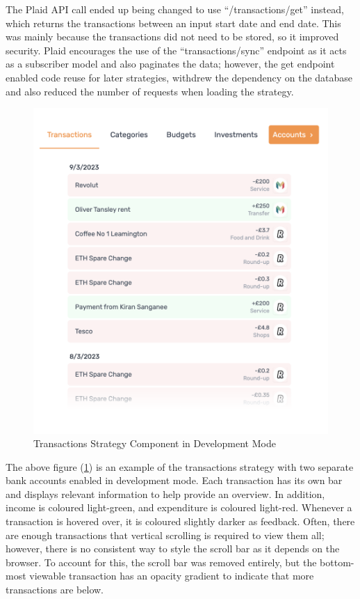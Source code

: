 The Plaid API call ended up being changed to use ``/transactions/get'' instead, which returns the transactions between an input start date and end date. This was mainly because the transactions did not need to be stored, so it improved security. Plaid encourages the use of the ``transactions/sync'' endpoint as it acts as a subscriber model and also paginates the data; however, the get endpoint enabled code reuse for later strategies, withdrew the dependency on the database and also reduced the number of requests when loading the strategy.

\begin{figure}[H]
	\centering
	\includegraphics[width=\textwidth]{images/transactions_development.png}
	\caption{Transactions Strategy Component in Development Mode}
	\label{fig:TransactionsStrategy}
\end{figure}

The above figure (\ref{fig:TransactionsStrategy}) is an example of the transactions strategy with two separate bank accounts enabled in development mode. Each transaction has its own bar and displays relevant information to help provide an overview. In addition, income is coloured light-green, and expenditure is coloured light-red. Whenever a transaction is hovered over, it is coloured slightly darker as feedback. Often, there are enough transactions that vertical scrolling is required to view them all; however, there is no consistent way to style the scroll bar as it depends on the browser. To account for this, the scroll bar was removed entirely, but the bottom-most viewable transaction has an opacity gradient to indicate that more transactions are below.

